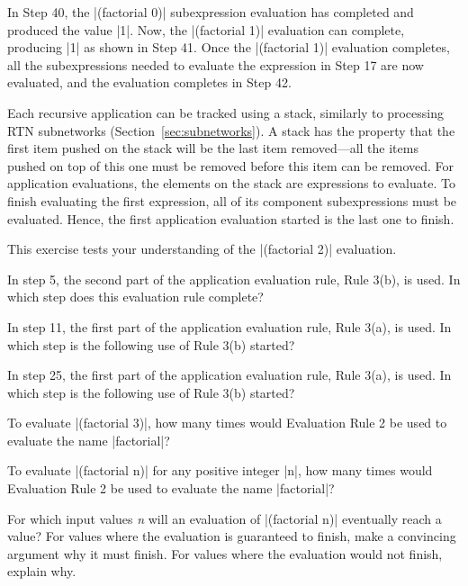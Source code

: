 \begin{schemeregion}
In Step 40, the \scheme|(factorial 0)| subexpression evaluation has completed and produced the value \schemeresult|1|.  Now, the \scheme|(factorial 1)| evaluation can complete, producing \schemeresult|1| as shown in Step 41.  Once the \scheme|(factorial 1)| evaluation completes, all the subexpressions needed to evaluate the expression in Step 17 are now evaluated, and the evaluation completes in Step 42.

Each recursive application can be tracked using a stack, similarly to processing RTN subnetworks (Section~\ref{sec:subnetworks}).  A stack has the property that the first item pushed on the stack will be the last item removed---all the items pushed on top of this one must be removed before this item can be removed.  For application evaluations, the elements on the stack are expressions to evaluate.  To finish evaluating the first expression, all of its component subexpressions must be evaluated.  Hence, the first application evaluation started is the last one to finish.

\beforesplitex
\begin{exercise}\label{ex:eval}
This exercise tests your understanding of the \scheme|(factorial 2)| evaluation. 
\begin{subexerciselist}
\item In step 5, the second part of the application evaluation rule, Rule 3(b), is used.  In which step does this evaluation rule complete?
\item In step 11, the first part of the application evaluation rule, Rule 3(a), is used.  In which step is the following use of Rule 3(b) started?
\item In step 25, the first part of the application evaluation rule, Rule 3(a), is used.  In which step is the following use of Rule 3(b) started?
\item \greenstar To evaluate \scheme|(factorial 3)|, how many times would Evaluation Rule 2 be used to evaluate the name \scheme|factorial|?
\item \goldstar To evaluate \scheme|(factorial n)| for any positive integer \scheme|n|, how many times would Evaluation Rule 2 be used to evaluate the name \scheme|factorial|?
\end{subexerciselist}
\end{exercise}
\aftersplitex

\beforesplitex
\begin{exercise}
For which input values \emph{n} will an evaluation of \scheme|(factorial n)| eventually reach a value?  For values where the evaluation is guaranteed to finish, make a convincing argument why it must finish.  For values where the evaluation would not finish, explain why.
\end{exercise}
\aftersplitex


\end{schemeregion}

